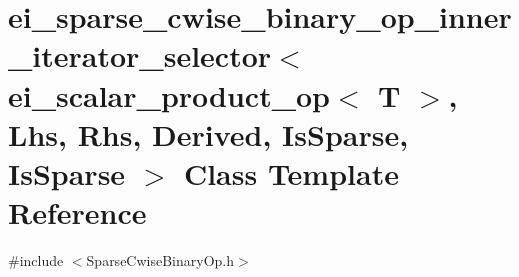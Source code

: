 \hypertarget{classei__sparse__cwise__binary__op__inner__iterator__selector_3_01ei__scalar__product__op_3_01_t3642a5ce0210f5e8cb62d8f3cd863802}{\section{ei\-\_\-sparse\-\_\-cwise\-\_\-binary\-\_\-op\-\_\-inner\-\_\-iterator\-\_\-selector$<$ ei\-\_\-scalar\-\_\-product\-\_\-op$<$ T $>$, Lhs, Rhs, Derived, Is\-Sparse, Is\-Sparse $>$ Class Template Reference}
\label{classei__sparse__cwise__binary__op__inner__iterator__selector_3_01ei__scalar__product__op_3_01_t3642a5ce0210f5e8cb62d8f3cd863802}
}


{\ttfamily \#include $<$Sparse\-Cwise\-Binary\-Op.\-h$>$}

